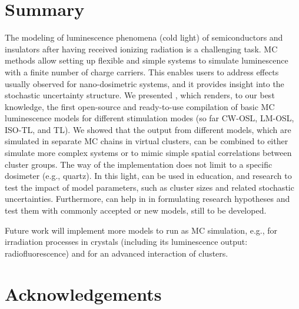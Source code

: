 \hypertarget{summary}{%
\section{Summary}\label{summary}}

The modeling of luminescence phenomena (cold light) of semiconductors
and insulators after having received ionizing radiation is a challenging
task. MC methods allow setting up flexible and simple systems to
simulate luminescence with a finite number of charge carriers. This
enables users to address effects usually observed for nano-dosimetric
systems, and it provides insight into the stochastic uncertainty
structure. We presented , which renders, to our best
knowledge, the first open-source and ready-to-use compilation of basic
MC luminescence models for different stimulation modes (so far CW-OSL,
LM-OSL, ISO-TL, and TL). We showed that the output from different models,
which are simulated in separate MC chains in virtual clusters, can be
combined to either simulate more complex systems or to mimic simple
spatial correlations between cluster groups. The way of the
implementation does not limit  to a specific
dosimeter (e.g., quartz). In this light,  can be used
in education, and research to test the impact of model
parameters, such as cluster sizes and related stochastic uncertainties.
Furthermore,  can help in in formulating research
hypotheses and test them with commonly accepted or new models, still to
be developed.

Future work will implement more models to run as MC simulation, e.g.,
for irradiation processes in crystals (including its luminescence
output: radiofluorescence) and for an advanced interaction of clusters.

\hypertarget{acknowledgements}{%
\section{Acknowledgements}\label{acknowledgements}}

